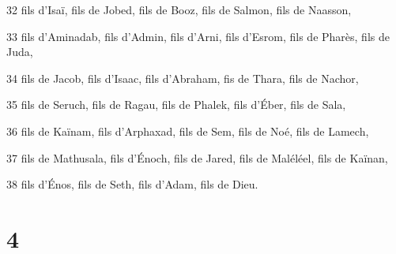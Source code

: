 \par 32 fils d'Isaï, fils de Jobed, fils de Booz, fils de Salmon, fils de Naasson,
\par 33 fils d'Aminadab, fils d'Admin, fils d'Arni, fils d'Esrom, fils de Pharès, fils de Juda,
\par 34 fils de Jacob, fils d'Isaac, fils d'Abraham, fis de Thara, fils de Nachor,
\par 35 fils de Seruch, fils de Ragau, fils de Phalek, fils d'Éber, fils de Sala,
\par 36 fils de Kaïnam, fils d'Arphaxad, fils de Sem, fils de Noé, fils de Lamech,
\par 37 fils de Mathusala, fils d'Énoch, fils de Jared, fils de Maléléel, fils de Kaïnan,
\par 38 fils d'Énos, fils de Seth, fils d'Adam, fils de Dieu.

\chapter{4}

